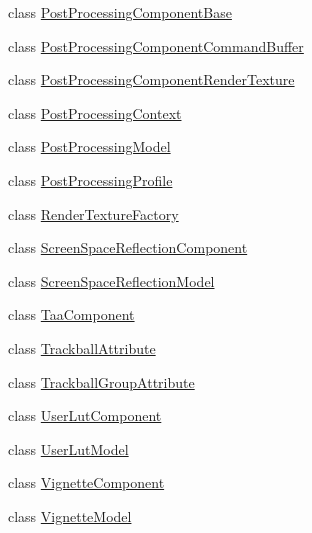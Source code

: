 \begin{DoxyCompactItemize}
class \hyperlink{class_unity_engine_1_1_post_processing_1_1_post_processing_component_base}{Post\+Processing\+Component\+Base}
\item 
class \hyperlink{class_unity_engine_1_1_post_processing_1_1_post_processing_component_command_buffer}{Post\+Processing\+Component\+Command\+Buffer}
\item 
class \hyperlink{class_unity_engine_1_1_post_processing_1_1_post_processing_component_render_texture}{Post\+Processing\+Component\+Render\+Texture}
\item 
class \hyperlink{class_unity_engine_1_1_post_processing_1_1_post_processing_context}{Post\+Processing\+Context}
\item 
class \hyperlink{class_unity_engine_1_1_post_processing_1_1_post_processing_model}{Post\+Processing\+Model}
\item 
class \hyperlink{class_unity_engine_1_1_post_processing_1_1_post_processing_profile}{Post\+Processing\+Profile}
\item 
class \hyperlink{class_unity_engine_1_1_post_processing_1_1_render_texture_factory}{Render\+Texture\+Factory}
\item 
class \hyperlink{class_unity_engine_1_1_post_processing_1_1_screen_space_reflection_component}{Screen\+Space\+Reflection\+Component}
\item 
class \hyperlink{class_unity_engine_1_1_post_processing_1_1_screen_space_reflection_model}{Screen\+Space\+Reflection\+Model}
\item 
class \hyperlink{class_unity_engine_1_1_post_processing_1_1_taa_component}{Taa\+Component}
\item 
class \hyperlink{class_unity_engine_1_1_post_processing_1_1_trackball_attribute}{Trackball\+Attribute}
\item 
class \hyperlink{class_unity_engine_1_1_post_processing_1_1_trackball_group_attribute}{Trackball\+Group\+Attribute}
\item 
class \hyperlink{class_unity_engine_1_1_post_processing_1_1_user_lut_component}{User\+Lut\+Component}
\item 
class \hyperlink{class_unity_engine_1_1_post_processing_1_1_user_lut_model}{User\+Lut\+Model}
\item 
class \hyperlink{class_unity_engine_1_1_post_processing_1_1_vignette_component}{Vignette\+Component}
\item 
class \hyperlink{class_unity_engine_1_1_post_processing_1_1_vignette_model}{Vignette\+Model}
\end{DoxyCompactItemize}
